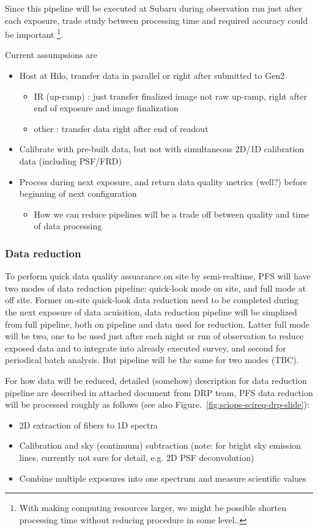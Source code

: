 \documentclass[a4paper,notitlepage]{article}
\begin{document}
Since this pipeline will be executed at Subaru during observation run just 
after each exposure, trade study between processing time and required accuracy 
could be important
\footnote{With making computing resources larger, we might be possible shorten 
processing time without reducing procedure in some level..}. 

Current assumpsions are 
\begin{itemize}
  \item Host at Hilo, transfer data in parallel or right after submitted to Gen2
    \begin{itemize}
      \item IR (up-ramp) : just transfer finalized image not raw up-ramp, right 
         after end of exposure and image finalization 
      \item other : transfer data right after end of readout
    \end{itemize}
  \item Calibrate with pre-built data, but not with simultaneous 2D/1D 
    calibration data (including PSF/FRD)
  \item Process during next exposure, and return data quality metrics (well?) 
    before beginning of next configuration
    \begin{itemize}
      \item How we can reduce pipelines will be a trade off between quality 
        and time of data processing
    \end{itemize}
\end{itemize}


\subsubsection{Data reduction}

To perform quick data quality assuarance on site by semi-realtime, 
PFS will have two modes of data reduction pipeline: quick-look mode on site, 
and full mode at off site. 
Former on-site quick-look data reduction need to be completed during 
the next exposure of data acuisition, data reduction pipeline will be 
simplized from full pipeline, both on pipeline and data used for reduction. 
Latter full mode will be two, one to be used just after each night or run 
of observation to reduce exposed data and to integrate into already executed 
survey, and second for periodical batch analysis. But pipeline will be 
the same for two modes (TBC). 

For how data will be reduced, 
detailed (somehow) description for data reduction pipeline are described 
in attached document from DRP team, PFS data reduction will be processed 
roughly as follows (see also Figure.~\ref{fig:sciops-scireq-drp-slide}): 
\begin{itemize}
  \item 2D extraction of fibers to 1D spectra
  \item Calibration and sky (continuum) subtraction (note: for bright sky 
    emission lines, currently not sure for detail, e.g. 2D PSF deconvolution)
  \item Combine multiple exposures into one spectrum and measure scientific 
    values
\end{itemize}
\end{document}
